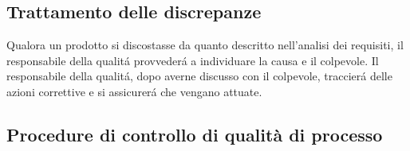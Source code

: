 \documentclass[a4paper]{article}
\begin{document}
\subsection{Trattamento delle discrepanze}
Qualora un prodotto si discostasse da quanto descritto nell'analisi dei requisiti, il responsabile della qualit\'a provveder\'a a individuare la causa e il colpevole. Il responsabile della qualit\'a, dopo averne discusso con il colpevole, traccier\'a delle azioni correttive e si assicurer\'a che vengano attuate.

\subsection{Procedure di controllo di qualità di processo}
\end{document}
